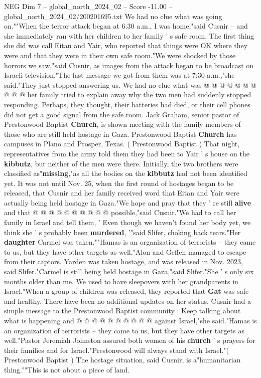 \begin{textsample}{NEG Dim 7 – global\_north\_2024\_02 – Score -11.00 – global\_north\_2024\_02/200201695.txt}
We had no clue what was going on.""When the terror attack began at 6:30 a.m., I was home,"said Cusnir -- and she immediately ran with her children to her family ' s safe room.
The first thing she did was call Eitan and Yair, who reported that things were OK where they were and that they were in their own safe room."We were shocked by those horrors we saw,"said Cusnir, as images from the attack began to be broadcast on Israeli television."The last message we got from them was at 7:30 a.m.,"she said."They just stopped answering us.
We had no clue what was @ @ @ @ @ @ @ @ @ @ her family tried to explain away why the two men had suddenly stopped responding.
Perhaps, they thought, their batteries had died, or their cell phones did not get a good signal from the safe room.
Jack Graham, senior pastor of Prestonwood Baptist \textbf{Church}, is shown meeting with the family members of those who are still held hostage in Gaza.
Prestonwood Baptist \textbf{Church} has campuses in Plano and Prosper, Texas. ( Prestonwood Baptist ) That night, representatives from the army told them they had been to Yair ' s house on the \textbf{kibbutz}, but neither of the men were there.
Initially, the two brothers were classified as"\textbf{missing},"as all the bodies on the \textbf{kibbutz} had not been identified yet.
It was not until Nov. 25, when the first round of hostages began to be released, that Cusnir and her family received word that Eitan and Yair were actually being held hostage in Gaza."We hope and pray that they ' re still \textbf{alive} and that @ @ @ @ @ @ @ @ @ @ possible,"said Cusnir."We had to call her family in Israel and tell them, ' Even though we haven't found her body yet, we think she ' s probably been \textbf{murdered}, '"said Slifer, choking back tears."Her \textbf{daughter} Carmel was taken.""Hamas is an organization of terrorists -- they came to us, but they have other targets as well."Alon and Geffen managed to escape from their captors.
Yarden was taken hostage, and was released in Nov. 2023, said Slifer."Carmel is still being held hostage in Gaza,"said Slifer."She ' s only six months older than me.
We used to have sleepovers with her grandparents in Israel."When a group of children was released, they reported that \textbf{Gat} was safe and healthy.
There have been no additional updates on her status.
Cusnir had a simple message to the Prestonwood Baptist community : Keep talking about what is happening and @ @ @ @ @ @ @ @ @ @ against Israel,"she said."Hamas is an organization of terrorists -- they came to us, but they have other targets as well."Pastor Jeremiah Johnston assured both women of his \textbf{church} ' s prayers for their families and for Israel."Prestonwood will always stand with Israel."( Prestonwood Baptist ) The hostage situation, said Cusnir, is a"humanitarian thing.""This is not about a piece of land.

\end{textsample}
